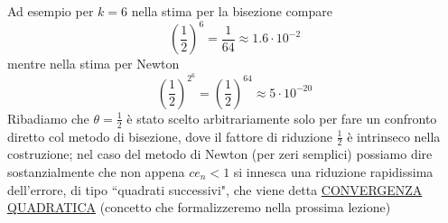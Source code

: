 \documentclass[12pt]{article}
\begin{document}
Ad esempio per $k=6$ nella stima per la bisezione compare
\[\left(\frac{1}{2}\right)^{6}=\frac{1}{64}\approx 1.6\cdot10^{-2}\]
mentre nella stima per Newton
\[\left(\frac{1}{2}\right)^{2^6}=\left(\frac{1}{2}\right)^{64}\approx 5\cdot10^{-20}\]
Ribadiamo che $\theta=\frac{1}{2}$ è stato scelto arbitrariamente solo per fare un confronto diretto col metodo di bisezione, dove il fattore di riduzione $\frac{1}{2}$ è intrinseco nella costruzione; nel caso del metodo di Newton (per zeri semplici) possiamo dire sostanzialmente che non appena $ce_n<1$ si innesca una riduzione rapidissima dell'errore, di tipo ``quadrati successivi", che viene detta \uline{CONVERGENZA QUADRATICA} (concetto che formalizzeremo nella prossima lezione)
\end{document}
